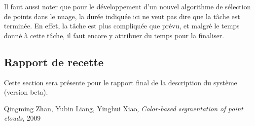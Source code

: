 \documentclass[12pt,titlepage,french]{article}
\begin{document}
Il faut aussi noter que pour le développement d'un nouvel algorithme de sélection de points dans le nuage, la durée indiquée ici ne veut pas dire que la tâche est terminée. En effet, la tâche est plus compliquée que prévu, et malgré le temps donné à cette tâche, il faut encore y attribuer du temps pour la finaliser.

\subsection{Rapport de recette}

Cette section sera présente pour le rapport final de la description du système (version beta).
\begin{thebibliography}{3}

   Qingming Zhan, Yubin Liang, Yinghui Xiao, \textit{Color-based segmentation of point clouds}, 2009
\end{thebibliography}
\end{document}

